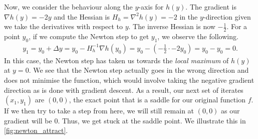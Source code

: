 Now, we consider the behaviour along the $y$-axis for $h(y)$. The gradient is $\nabla h(y) = -2y$ and the Hessian is $H_h = \nabla^2 h(y) = -2$ in the $y$-direction given we take the derivatives with respect to $y$. The inverse Hessian is now $-\frac{1}{2}$. For a point $y_0$, if we compute the Newton step to get $y_1$, we observe the following.
\begin{align}
    y_1 = y_0 + \Delta y = y_0 - H_h^{-1} \nabla h(y_0) = y_0 - \left(-\frac{1}{2} \cdot -2 y_0\right) = y_0 - y_0 = 0.
\end{align}
In this case, the Newton step has taken us towards the \textit{local maximum} of $h(y)$ at $y = 0$. We see that the Newton step actually goes in the wrong direction and does not minimise the function, which would involve taking the negative gradient direction as is done with gradient descent. As a result, our next set of iterates $(x_1, y_1)$ are $(0, 0)$, the exact point that is a saddle for our original function $f$. If we then try to take a step from here, we will still remain at $(0, 0)$ as our gradient will be $0$. Thus, we get stuck at the saddle point. We illustrate this in \cref{fig:newton_attract}.

